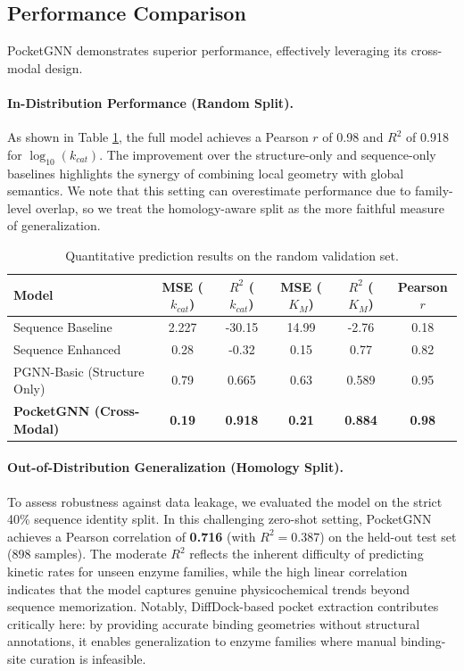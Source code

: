 \documentclass[11pt]{article}
\begin{document}
\subsection{Performance Comparison}

PocketGNN demonstrates superior performance, effectively leveraging its cross-modal design.

\paragraph{In-Distribution Performance (Random Split).}
As shown in Table \ref{tab:results}, the full model achieves a Pearson $r$ of 0.98 and $R^2$ of 0.918 for $\log_{10}(k_{cat})$. The improvement over the structure-only and sequence-only baselines highlights the synergy of combining local geometry with global semantics. We note that this setting can overestimate performance due to family-level overlap, so we treat the homology-aware split as the more faithful measure of generalization.

\begin{table}[h]
\centering
\caption{Quantitative prediction results on the random validation set.}
\label{tab:results}
\begin{tabular}{lccccc}
\toprule
Model & MSE ($k_{cat}$) & $R^2$ ($k_{cat}$) & MSE ($K_M$) & $R^2$ ($K_M$) & Pearson $r$ \\
\midrule
Sequence Baseline & 2.227 & -30.15 & 14.99 & -2.76 & 0.18 \\
Sequence Enhanced & 0.28 & -0.32 & 0.15 & 0.77 & 0.82 \\
PGNN-Basic (Structure Only) & 0.79 & 0.665 & 0.63 & 0.589 & 0.95 \\
\textbf{PocketGNN (Cross-Modal)} & \textbf{0.19} & \textbf{0.918} & \textbf{0.21} & \textbf{0.884} & \textbf{0.98} \\
\bottomrule
\end{tabular}
\end{table}

\paragraph{Out-of-Distribution Generalization (Homology Split).}
To assess robustness against data leakage, we evaluated the model on the strict 40\% sequence identity split. In this challenging zero-shot setting, PocketGNN achieves a Pearson correlation of \textbf{0.716} (with $R^2=0.387$) on the held-out test set (898 samples). The moderate $R^2$ reflects the inherent difficulty of predicting kinetic rates for unseen enzyme families, while the high linear correlation indicates that the model captures genuine physicochemical trends beyond sequence memorization. Notably, DiffDock-based pocket extraction contributes critically here: by providing accurate binding geometries without structural annotations, it enables generalization to enzyme families where manual binding-site curation is infeasible.
\end{document}
